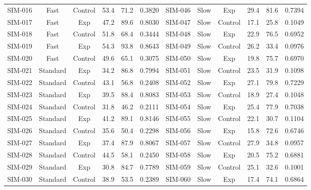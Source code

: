 \documentclass[10pt,journal,compsoc]{IEEEtran}
\begin{document}
\begin{table}[!t]
{\begin{tabular}{c c c c c c | c c c c c c}
SIM-016 & Fast & Control & 53.4 & 71.2 & 0.3820 & SIM-046 & Slow & Exp & 29.4 & 81.6 & 0.7394 \\
SIM-017 & Fast & Exp & 47.2 & 89.6 & 0.8030 & SIM-047 & Slow & Control & 17.1 & 25.8 & 0.1049 \\
SIM-018 & Fast & Control & 51.8 & 68.4 & 0.3444 & SIM-048 & Slow & Exp & 22.9 & 76.5 & 0.6952 \\
SIM-019 & Fast & Exp & 54.3 & 93.8 & 0.8643 & SIM-049 & Slow & Control & 26.2 & 33.4 & 0.0976 \\
SIM-020 & Fast & Control & 49.6 & 65.1 & 0.3075 & SIM-050 & Slow & Exp & 19.8 & 75.7 & 0.6970 \\
SIM-021 & Standard & Exp & 34.2 & 86.8 & 0.7994 & SIM-051 & Slow & Control & 23.5 & 31.9 & 0.1098 \\
SIM-022 & Standard & Control & 43.1 & 56.8 & 0.2408 & SIM-052 & Slow & Exp & 27.1 & 79.8 & 0.7229 \\
SIM-023 & Standard & Exp & 39.5 & 88.4 & 0.8083 & SIM-053 & Slow & Control & 18.9 & 27.4 & 0.1048 \\
SIM-024 & Standard & Control & 31.8 & 46.2 & 0.2111 & SIM-054 & Slow & Exp & 25.4 & 77.9 & 0.7038 \\
SIM-025 & Standard & Exp & 41.2 & 89.1 & 0.8146 & SIM-055 & Slow & Control & 22.1 & 30.7 & 0.1104 \\
SIM-026 & Standard & Control & 35.6 & 50.4 & 0.2298 & SIM-056 & Slow & Exp & 15.8 & 72.6 & 0.6746 \\
SIM-027 & Standard & Exp & 37.4 & 87.9 & 0.8067 & SIM-057 & Slow & Control & 27.9 & 34.8 & 0.0957 \\
SIM-028 & Standard & Control & 44.5 & 58.1 & 0.2450 & SIM-058 & Slow & Exp & 20.5 & 75.2 & 0.6881 \\
SIM-029 & Standard & Exp & 30.8 & 84.7 & 0.7789 & SIM-059 & Slow & Control & 25.1 & 32.6 & 0.1001 \\
SIM-030 & Standard & Control & 38.9 & 53.5 & 0.2389 & SIM-060 & Slow & Exp & 17.4 & 74.1 & 0.6864 \\
\bottomrule
\end{tabular}
}
\end{table}
\end{document}
